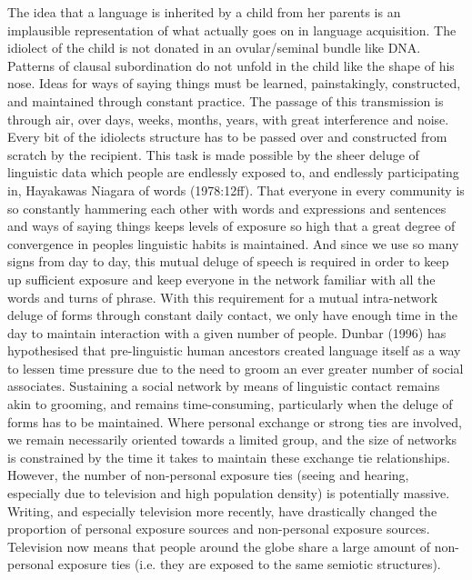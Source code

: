 The idea that a language is inherited by a child from her parents is an implausible representation of what actually goes on in language acquisition. The idiolect of the child is not donated in an ovular/seminal bundle like DNA. Patterns of clausal subordination do not unfold in the child like the shape of his nose. Ideas for ways of saying things must be learned, painstakingly, constructed, and maintained through constant practice. The passage of this transmission is through air, over days, weeks, months, years, with great interference and noise. Every bit of the idiolects structure has to be passed over and constructed from scratch by the recipient. This task is made possible by the sheer deluge of linguistic data which people are endlessly exposed to, and endlessly participating in, Hayakawas Niagara of words (1978:12ff). That everyone in every community is so constantly hammering each other with words and expressions and sentences and ways of saying things keeps levels of exposure so high that a great degree of convergence in peoples linguistic habits is maintained. And since we use so many signs from day to day, this mutual deluge of speech is required in order to keep up sufficient exposure and keep everyone in the network familiar with all the words and turns of phrase. With this requirement for a mutual intra-network deluge of forms through constant daily contact, we only have enough time in the day to maintain interaction with a given number of people. Dunbar (1996) has hypothesised that pre-linguistic human ancestors created language itself as a way to lessen time pressure due to the need to groom an ever greater number of social associates. Sustaining a social network by means of linguistic contact remains akin to grooming, and remains time-consuming, particularly when the deluge of forms has to be maintained. Where personal exchange or strong ties  are involved, we remain necessarily oriented towards a limited group, and the size of networks is constrained by the time it takes to maintain these exchange tie relationships. However, the number of non-personal exposure ties (seeing and hearing, especially due to television and high population density) is potentially massive. Writing, and especially television more recently, have drastically changed the proportion of personal exposure sources and non-personal exposure sources. Television now means that people around the globe share a large amount of non-personal exposure ties (i.e. they are exposed to the same semiotic structures).

